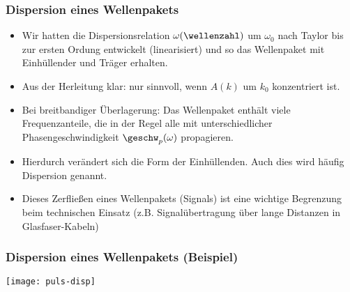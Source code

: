 \begin{frame}
  \frametitle{Dispersion eines Wellenpakets}
      \begin{itemize}[<+->]
      \item Wir hatten die Dispersionsrelation \(\omega(\wellenzahl)\) um \(\omega_0\) nach Taylor bis zur ersten Ordung entwickelt (\alert{linearisiert}) und so das Wellenpaket mit Einhüllender und Träger erhalten.
        \item Aus der Herleitung klar: nur sinnvoll, wenn \(A(k)\) um \(k_0\) \alert{konzentriert} ist.
        \item Bei breitbandiger Überlagerung: Das Wellenpaket enthält viele Frequenzanteile, die in der Regel alle mit \alert{unterschiedlicher Phasengeschwindigkeit} \(\geschw_p(\omega)\) propagieren.
        \item Hierdurch verändert sich die Form der Einhüllenden. Auch dies wird häufig \alert{Dispersion} genannt.
          \item Dieses \alert{Zerfließen} eines Wellenpakets (Signals) ist eine wichtige Begrenzung beim technischen Einsatz (z.B. Signalübertragung über lange Distanzen in Glasfaser-Kabeln)
 \end{itemize}
  \end{frame}

 \begin{frame}
   \frametitle{Dispersion eines Wellenpakets (Beispiel)}
   \centering
   \texttt{[image: puls-disp]}
  \end{frame}



   
